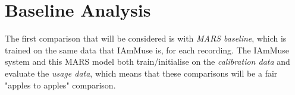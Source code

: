 \section{Baseline Analysis}
\label{section: evaluation - baseline analysis}


The first comparison that will be considered is with \textit{MARS baseline}, which is trained on the same data that IAmMuse is, for each recording.
The IAmMuse system and this MARS model both train/initialise on the \textit{calibration data} and evaluate the \textit{usage data}, which means that these comparisons will be a fair "apples to apples" comparison.


